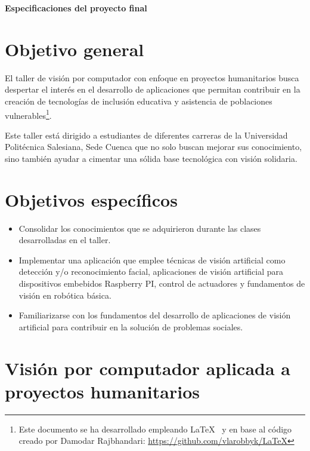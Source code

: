 \documentclass[a4paper,10pt]{article}
\begin{document}
\vspace*{2.1cm}

\begin{center}
\bfseries \LARGE Especificaciones del proyecto final
\end{center}

\vspace{0.1cm} 

\section{Objetivo general}

El taller de visión por computador con enfoque en proyectos humanitarios busca despertar el interés en el desarrollo de aplicaciones que permitan contribuir en la creación de tecnologías de inclusión educativa y asistencia de poblaciones vulnerables\footnote{Este documento se ha desarrollado empleando \LaTeX~ y en base al código creado por Damodar Rajbhandari: \url{https://github.com/vlarobbyk/LaTeX}}.

Este taller está dirigido a estudiantes de diferentes carreras de la Universidad Politécnica Salesiana, Sede Cuenca que no solo buscan mejorar sus conocimiento, sino también ayudar a cimentar una sólida base tecnológica con visión solidaria.


\section{Objetivos específicos}

\begin{itemize}
	\item Consolidar los conocimientos que se adquirieron durante las clases desarrolladas en el taller.
	\item Implementar una aplicación que emplee técnicas de visión artificial como detección y/o reconocimiento facial, aplicaciones de visión artificial para dispositivos embebidos Raspberry PI, control de actuadores y fundamentos de visión en robótica básica.
	\item Familiarizarse con los fundamentos del desarrollo de aplicaciones de visión artificial para contribuir en la solución de problemas sociales.
\end{itemize}


\section{Visión por computador aplicada a proyectos humanitarios}
\end{document}
